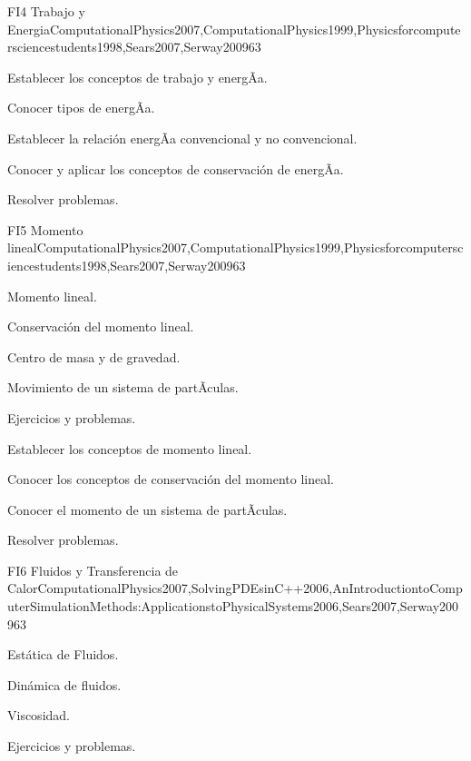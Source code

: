 \begin{syllabus}
\begin{unit}{FI4 Trabajo y Energia}{ComputationalPhysics2007,ComputationalPhysics1999,Physicsforcomputersciencestudents1998,Sears2007,Serway2009}{6}{3}
   \begin{unitgoals}
      \item Establecer los conceptos de trabajo y energÃ­a.
      \item Conocer tipos de energÃ­a.
      \item Establecer la relación energÃ­a convencional y no convencional.
      \item Conocer y aplicar los conceptos de conservación de energÃ­a.
      \item Resolver problemas.
   \end{unitgoals}
\end{unit}

\begin{unit}{FI5 Momento lineal}{ComputationalPhysics2007,ComputationalPhysics1999,Physicsforcomputersciencestudents1998,Sears2007,Serway2009}{6}{3}
\begin{topics}
      \item Momento lineal.
      \item Conservación del momento lineal.
      \item Centro de masa y de gravedad.
      \item Movimiento de un sistema de partÃ­culas.
      \item Ejercicios y problemas.
  \end{topics}

   \begin{unitgoals}
      \item Establecer los conceptos de momento lineal.
      \item Conocer los conceptos de conservación del momento lineal.
      \item Conocer el momento de un sistema de partÃ­culas.
      \item Resolver problemas.
   \end{unitgoals}
\end{unit}

\begin{unit}{FI6 Fluidos y Transferencia de Calor}{ComputationalPhysics2007,SolvingPDEsinC++2006,AnIntroductiontoComputerSimulationMethods:ApplicationstoPhysicalSystems2006,Sears2007,Serway2009}{6}{3}
\begin{topics}
      \item Estática de Fluidos.
      \item Dinámica de fluidos. 
      \item Viscosidad.
      \item Ejercicios y problemas.
  \end{topics}


\end{unit}
\end{syllabus}
